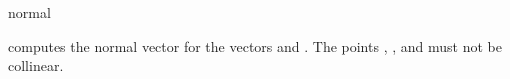 \begin{ccRefFunction}{normal}

 {computes the normal vector for the  vectors  and .
 \ccPrecond The points , , and  must not be collinear.}


\end{ccRefFunction}

